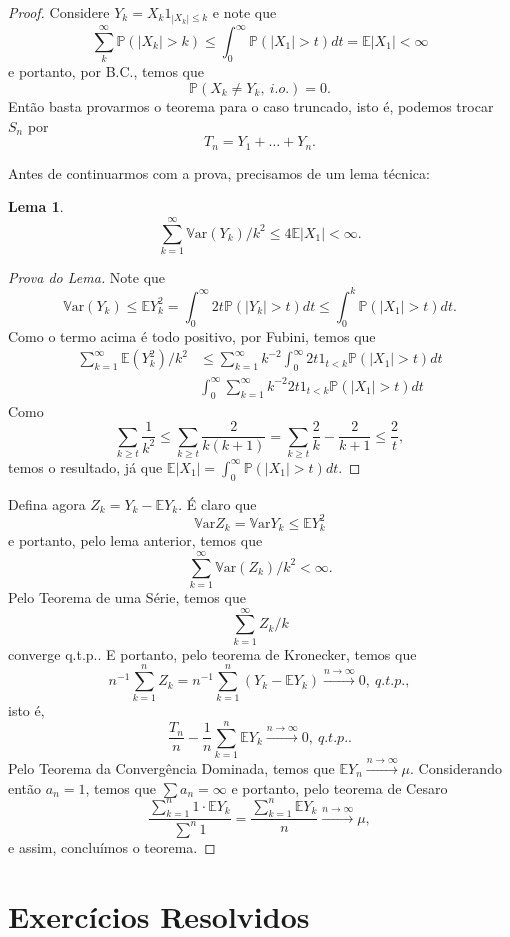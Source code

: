 \documentclass[12pt,a4paper,oneside]{book}
\newtheorem{lemma}[theorem]{Lema}
\theoremstyle{definition}
\theoremstyle{remark}
\numberwithin{equation}{section}
\newcommand{\E}{\mathbb{E}}
\newcommand{\pr}{\mathbb{P}}
\newcommand{\Var}{\mathbb{V}\text{ar}}
\newcommand{\rarrowlimn}{\xrightarrow{n\rightarrow \infty}}
\begin{document}
\begin{proof}
Considere $Y_k = X_k1_{|X_k|\leq k}$ e note que 
$$\sum_k^\infty \pr(|X_k|>k)\leq \int_0^\infty\pr(|X_1|>t)dt = \E|X_1|<\infty $$ e portanto, por B.C., temos que 
$$\pr(X_k \neq Y_k,\ i.o.)=0. $$
Então basta provarmos o teorema para o caso truncado, isto é, podemos trocar $S_n$ por
$$T_n = Y_1+\dots+Y_n .$$

Antes de continuarmos com a prova, precisamos de um lema técnica:

\begin{lemma}
 $$\sum^\infty_{k=1} \Var(Y_k)/k^2 \leq 4\E|X_1|<\infty. $$
\end{lemma}
\begin{proof}[Prova do Lema]
Note que
$$\Var(Y_k) \leq \E Y_k^2 = \int^\infty_0 2t\pr(|Y_k|>t)dt \leq \int^k_0 \pr(|X_1|>t)dt. $$
Como o termo acima é todo positivo, por Fubini, temos que
\begin{align*}
\sum^\infty_{k=1} \E(Y_k^2)/k^2 &\leq \sum^\infty_{k=1}k^{-2} \int_0^\infty 2t1_{t<k} \pr(|X_1|>t)dt\\
& \int_0^\infty\sum^\infty_{k=1}k^{-2}  2t1_{t<k} \pr(|X_1|>t)dt
\end{align*}
Como 
$$\sum_{k\geq t}\frac{1}{k^2}\leq \sum_{k\geq t} \frac{2}{k(k+1)} =  \sum_{k\geq t} \frac{2}{k}-\frac{2}{k+1} \leq \frac{2}{t},   $$
temos o resultado, já que $\E|X_1|= \int_0^\infty \pr(|X_1|>t)dt.$
\end{proof}

Defina agora $Z_k = Y_k - \E Y_k$. É claro que 
$$\Var Z_k = \Var Y_k \leq \E Y_k^2 $$ e portanto, pelo lema anterior, temos que
$$\sum_{k=1}^\infty \Var(Z_k)/k^2 < \infty. $$
Pelo Teorema de uma Série, temos que
$$\sum_{k=1}^\infty Z_k/k $$
converge q.t.p.. E portanto, pelo teorema de Kronecker, temos que
$$n^{-1}\sum_{k=1}^n Z_k =  n^{-1}\sum_{k=1}^n (Y_k - \E Y_k) \rarrowlimn 0,\ q.t.p., $$
isto é,
$$\frac{T_n}{n} - \dfrac{1}{n}\sum^n_{k=1} \E Y_k \rarrowlimn 0,\ q.t.p.. $$
Pelo Teorema da Convergência Dominada, temos que $\E Y_n \rarrowlimn \mu$. Considerando então $a_n = 1$, temos que $\sum a_n = \infty$ e portanto, pelo teorema de Cesaro
$$ \dfrac{\sum^n_{k=1}1\cdot \E Y_k}{\sum^n 1} = \dfrac{\sum^n_{k=1} \E Y_k}{n} \rarrowlimn \mu, $$
e assim, concluímos o teorema.
\end{proof}

\newpage
\section{Exercícios Resolvidos}
\end{document}
